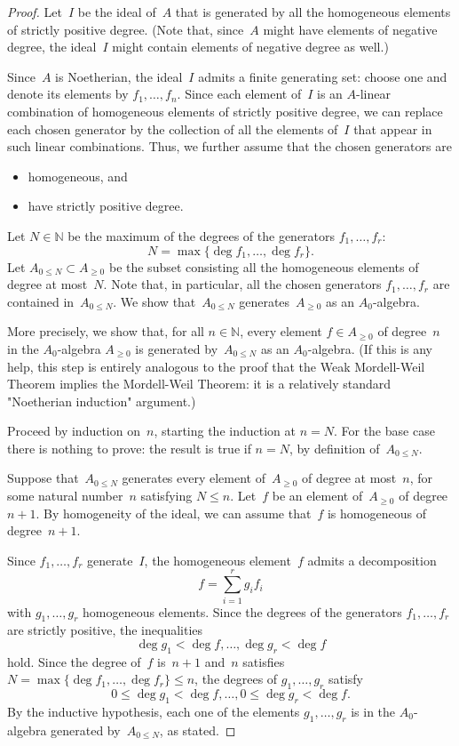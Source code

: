 \documentclass{amsart}
\newcommand{\N}{\mathbb{N}}
\newcommand{\Az}{A_{\geq0}}
\newcommand{\An}{A_{0\leq N}}
\begin{document}
\begin{proof}
Let~$I$ be the ideal of~$A$ that is generated by all the homogeneous elements of strictly positive degree.  (Note that, since~$A$ might have elements of negative degree, the ideal~$I$ might contain elements of negative degree as well.)

Since~$A$ is Noetherian, the ideal~$I$ admits a finite generating set: choose one and denote its elements by $f_1, \ldots , f_n$.  Since each element of~$I$ is an $A$-linear combination of homogeneous elements of strictly positive degree, we can replace each chosen generator by the collection of all the elements of~$I$ that appear in such linear combinations.  Thus, we further assume that the chosen generators are
\begin{itemize}
\item
homogeneous, and
\item
have strictly positive degree.
\end{itemize}
Let $N \in \N$ be the maximum of the degrees of the generators $f_1, \ldots , f_r$:
\[
N = \max \{ \deg f_1 , \ldots , \deg f_r \}.
\]
Let $\An \subset \Az$ be the subset consisting all the homogeneous elements of degree at most~$N$.  Note that, in particular, all the chosen generators $f_1, \ldots , f_r$ are contained in~$\An$.  We show that~$\An$ generates~$\Az$ as an $A_0$-algebra.

More precisely, we show that, for all $n \in \N$, every element $f \in \Az$ of degree~$n$ in the $A_0$-algebra $\Az$ is generated by~$\An$ as an $A_0$-algebra. (If this is any help, this step is entirely analogous to the proof that the Weak Mordell-Weil Theorem implies the Mordell-Weil Theorem: it is a relatively standard "Noetherian induction" argument.)

Proceed by induction on~$n$, starting the induction at $n = N$.  For the base case there is nothing to prove: the result is true if $n = N$, by definition of~$\An$.

Suppose that~$\An$ generates every element of~$\Az$ of degree at most~$n$, for some natural number~$n$ satisfying $N \le n$.  Let~$f$ be an element of~$\Az$ of degree $n+1$.  By homogeneity of the ideal, we can assume that~$f$ is homogeneous of degree~$n+1$.

Since $f_1, \ldots, f_r$ generate~$I$, the homogeneous element~$f$ admits a decomposition
\[
f = \sum_{i = 1}^r g_i f_i
\]
with $g_1, \ldots, g_r$ homogeneous elements.  Since the degrees of the generators $f_1, \ldots , f_r$ are strictly positive, the inequalities
\[
\deg g_1 < \deg f, \ldots , \deg g_r < \deg f
\]
hold.  Since the degree of~$f$ is~$n+1$ and~$n$ satisfies $N = \max \{\deg f_1 , \ldots , \deg f_r \} \le n$, the degrees of $g_1, \ldots , g_r$ satisfy
\[
0 \le \deg g_1 < \deg f, \ldots , 0 \le \deg g_r < \deg f.
\]
By the inductive hypothesis, each one of the elements $g_1, \ldots , g_r$ is in the $A_0$-algebra generated by~$\An$, as stated.


\end{proof}
\end{document}
